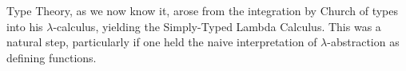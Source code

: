 \documentclass[11pt,twocolumn]{article}
\newcommand{\lcalculus}{\mbox{$\lambda$-calculus}}
\begin{document}
Type Theory, as we now know it, arose from the integration by Church
of types into his \lcalculus, yielding the %
Simply-Typed Lambda Calculus. %
This was a natural step, particularly if one held the naive interpretation of
\mbox{$\lambda$-abstraction} as defining functions.  
\end{document}
